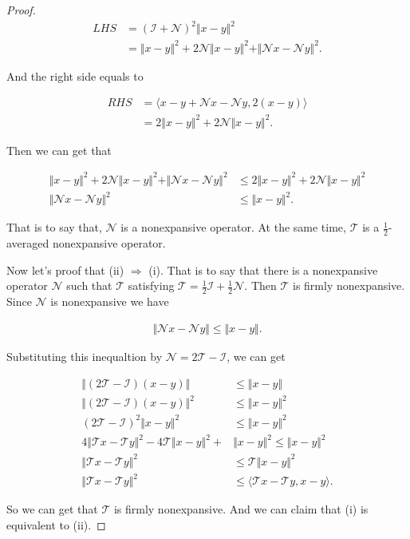 \documentclass{report}
\begin{document}
\begin{proof}
\begin{align*}
    LHS&={(\mathcal{I}+\mathcal{N})}^2 \Vert x-y \Vert ^2 \\
    &=\Vert x-y\Vert^2 +2\mathcal{N}\Vert x-y\Vert^2 +\Vert \mathcal{N}x-\mathcal{N}y\Vert^2. 
\end{align*}

And the right side equals to 

\begin{align*}
    RHS&=\langle x-y+\mathcal{N}x-\mathcal{N}y,2(x-y)\rangle\\
    &=2\Vert x-y\Vert^2+ 2\mathcal{N} \Vert x-y\Vert^2.
\end{align*}

\par Then we can get that 

\begin{align*}
    \Vert x-y\Vert^2 +2\mathcal{N}\Vert x-y\Vert^2 +\Vert \mathcal{N}x-\mathcal{N}y\Vert^2 &\leq 2\Vert x-y\Vert^2+ 2\mathcal{N} \Vert x-y\Vert^2 \\
    \Vert\mathcal{N}x-\mathcal{N}y\Vert^2 &\leq \Vert x-y\Vert ^2. 
\end{align*}

\par That is to say that, $\mathcal{N}$ is a nonexpansive operator. 
At the same time, $\mathcal{T}$ is a $\frac{1}{2}$-averaged nonexpansive operator. 

\par Now let's proof that (ii) $\Rightarrow $ (i). 
That is to say that there is a nonexpansive operator $\mathcal{N}$ such that $\mathcal{T}$ satisfying $\mathcal{T}=\frac{1}{2} \mathcal{I}+\frac{1}{2} \mathcal{N}$.
Then $\mathcal{T}$ is firmly nonexpansive. 
Since $\mathcal{N}$ is nonexpansive we have 

\begin{align*}
    \Vert \mathcal{N}x-\mathcal{N}y\Vert \leq \Vert x-y\Vert.
\end{align*}

Substituting this inequaltion by $\mathcal{N}=2\mathcal{T}-\mathcal{I}$, we can get 

\begin{align*}
    \Vert (2\mathcal{T}-\mathcal{I})(x-y)\Vert &\leq \Vert x-y\Vert \\
    \Vert (2\mathcal{T}-\mathcal{I})(x-y)\Vert^2 &\leq \Vert x-y\Vert ^2 \\
    {(2\mathcal{T}-\mathcal{I})}^2 \Vert x-y \Vert ^2 &\leq \Vert x-y\Vert ^2 \\
    4\Vert \mathcal{T}x-\mathcal{T}y\Vert ^2 -4\mathcal{T}\Vert x-y\Vert^2 +&\Vert x-y\Vert^2 \leq \Vert x-y\Vert^2\\ 
    \Vert \mathcal{T}x-\mathcal{T}y\Vert^2 &\leq \mathcal{T}\Vert x-y\Vert^2 \\
    \Vert \mathcal{T}x-\mathcal{T}y\Vert^2 &\leq \langle \mathcal{T}x-\mathcal{T}y,x-y\rangle.
\end{align*}

\par So we can get that $\mathcal{T}$ is firmly nonexpansive. 
And we can claim that (i) is equivalent to (ii). 
\end{proof}
\end{document}
